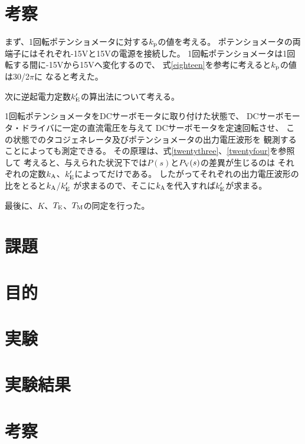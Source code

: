 \documentclass[uplatex, 11pt,a4j, titlepage]{jsarticle}
\begin{document}
\newpage

\section{考察}

まず、1回転ポテンショメータに対する$k_{\rm p}$の値を考える。
ポテンショメータの両端子にはそれぞれ-15Vと15Vの電源を接続した。
1回転ポテンショメータは1回転する間に-15Vから15Vへ変化するので、
式\ref{eighteen}を参考に考えると$k_{\rm p}$の値は30/2$\pi$に
なると考えた。

\newpage

次に逆起電力定数$k'_{\rm E}$の算出法について考える。

1回転ポテンショメータをDCサーボモータに取り付けた状態で、
DCサーボモータ・ドライバに一定の直流電圧を与えて
DCサーボモータを定速回転させ、
この状態でのタコジェネレータ及びポテンショメータの出力電圧波形を
観測することによっても測定できる。
その原理は、式\ref{twentythree}、\ref{twentyfour}を参照して
考えると、与えられた状況下では$P(s)$と$P_{\rm V}(s)$の差異が生じるのは
それぞれの定数$k_{\rm A}$、$k'_{\rm E}$によってだけである。
したがってそれぞれの出力電圧波形の比をとると$k_{\rm A}$/$k'_{\rm E}$
が求まるので、そこに$k_{\rm A}$を代入すれば$k'_{\rm E}$が求まる。

最後に、$K$、$T_{\rm E}$、$T_{\rm M}$の同定を行った。


\section{課題}


\newpage


\subtitle{2020/11/6}

\section{目的}
\section{実験}
\section{実験結果}
\section{考察}
\end{document}
